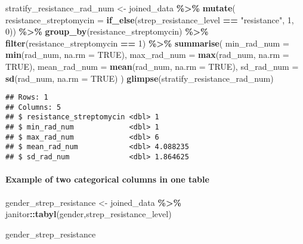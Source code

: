 \documentclass[
]{article}
\newenvironment{Shaded}{\begin{snugshade}}{\end{snugshade}}
\newcommand{\AttributeTok}[1]{\textcolor[rgb]{0.13,0.29,0.53}{#1}}
\newcommand{\ConstantTok}[1]{\textcolor[rgb]{0.56,0.35,0.01}{#1}}
\newcommand{\DecValTok}[1]{\textcolor[rgb]{0.00,0.00,0.81}{#1}}
\newcommand{\FunctionTok}[1]{\textcolor[rgb]{0.13,0.29,0.53}{\textbf{#1}}}
\newcommand{\NormalTok}[1]{#1}
\newcommand{\OtherTok}[1]{\textcolor[rgb]{0.56,0.35,0.01}{#1}}
\newcommand{\SpecialCharTok}[1]{\textcolor[rgb]{0.81,0.36,0.00}{\textbf{#1}}}
\newcommand{\StringTok}[1]{\textcolor[rgb]{0.31,0.60,0.02}{#1}}
\begin{document}
\begin{Shaded}
\begin{Highlighting}[]
\NormalTok{stratify\_resistance\_rad\_num }\OtherTok{\textless{}{-}}\NormalTok{ joined\_data }\SpecialCharTok{\%\textgreater{}\%}
  \FunctionTok{mutate}\NormalTok{(}
    \AttributeTok{resistance\_streptomycin =} 
      \FunctionTok{if\_else}\NormalTok{(strep\_resistance\_level }\SpecialCharTok{==} \StringTok{"resistance"}\NormalTok{, }\DecValTok{1}\NormalTok{, }\DecValTok{0}\NormalTok{)) }\SpecialCharTok{\%\textgreater{}\%}
  \FunctionTok{group\_by}\NormalTok{(resistance\_streptomycin) }\SpecialCharTok{\%\textgreater{}\%} 
  \FunctionTok{filter}\NormalTok{(resistance\_streptomycin }\SpecialCharTok{==} \DecValTok{1}\NormalTok{) }\SpecialCharTok{\%\textgreater{}\%}
  \FunctionTok{summarise}\NormalTok{(}
    \AttributeTok{min\_rad\_num  =} \FunctionTok{min}\NormalTok{(rad\_num, }\AttributeTok{na.rm =} \ConstantTok{TRUE}\NormalTok{),}
    \AttributeTok{max\_rad\_num  =} \FunctionTok{max}\NormalTok{(rad\_num, }\AttributeTok{na.rm =} \ConstantTok{TRUE}\NormalTok{),}
    \AttributeTok{mean\_rad\_num =} \FunctionTok{mean}\NormalTok{(rad\_num, }\AttributeTok{na.rm =} \ConstantTok{TRUE}\NormalTok{),}
    \AttributeTok{sd\_rad\_num   =} \FunctionTok{sd}\NormalTok{(rad\_num, }\AttributeTok{na.rm =} \ConstantTok{TRUE}\NormalTok{)}
\NormalTok{  )}
\FunctionTok{glimpse}\NormalTok{(stratify\_resistance\_rad\_num)}
\end{Highlighting}
\end{Shaded}

\begin{verbatim}
## Rows: 1
## Columns: 5
## $ resistance_streptomycin <dbl> 1
## $ min_rad_num             <dbl> 1
## $ max_rad_num             <dbl> 6
## $ mean_rad_num            <dbl> 4.088235
## $ sd_rad_num              <dbl> 1.864625
\end{verbatim}

\paragraph{Example of two categorical columns in one
table}\label{example-of-two-categorical-columns-in-one-table}

\begin{Shaded}
\begin{Highlighting}[]
\NormalTok{gender\_strep\_resistance }\OtherTok{\textless{}{-}}\NormalTok{ joined\_data }\SpecialCharTok{\%\textgreater{}\%}\NormalTok{ janitor}\SpecialCharTok{::}\FunctionTok{tabyl}\NormalTok{(gender,strep\_resistance\_level)}

\NormalTok{gender\_strep\_resistance}
\end{Highlighting}
\end{Shaded}
\end{document}
